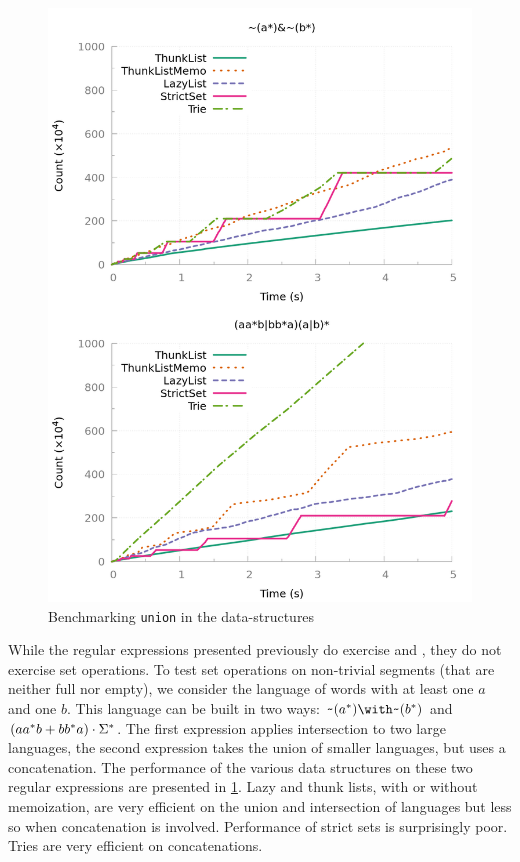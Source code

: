 \begin{figure}[!tp]
  \includegraphics[width=\linewidth]{measure/ocaml_union.png}
  \caption{Benchmarking \texttt{union} in the \ocaml data-structures}
  \label{bench:ocaml:union}
\end{figure}

While the regular expressions presented previously do exercise
 and , they do not exercise set
operations.  To test set operations on non-trivial segments (that are
neither full nor empty), we consider the language of words with at
least one $a$ and one $b$. This language can be built in two ways:
$\Rintersect{\Rcomplement{(\Rstar{a})}}{\Rcomplement{(\Rstar{b})}}$
and $(aa^*b +{bb^*a}) \cdot{\Sigma^*}$.
The first expression applies {intersection} to two large languages,
the second expression takes the union of smaller languages, but uses a
concatenation.  The performance of the various data structures on
these two regular expressions are presented in
\cref{bench:ocaml:union}.  Lazy and thunk lists, with or without
memoization, are very efficient on the union and intersection of
languages but less so when concatenation is involved. Performance of
strict sets is surprisingly poor.
Tries are very efficient on concatenations.

